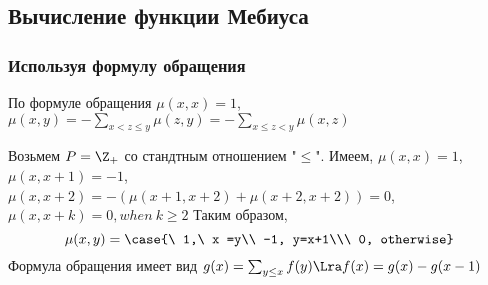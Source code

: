 \documentclass[unicode, 10pt, a4paper, oneside, fleqn]{article}
\begin{document}
\subsection{Вычисление функции Мебиуса}
\subsubsection{Используя формулу обращения}
По формуле обращения $\mu(x,x) =1$, $\displaystyle \mu(x,y) = -\sum_{x<z\le y}\mu(z,y) =-\sum_{x\le z<y}\mu(x,z)$
\begin{ex}
  Возьмем $P=\Z_+$ со стандтным отношением "$\le$". Имеем,
  $\mu(x,x) =1$, $\mu(x,x+1)=-1$, $\mu(x,x+2) = -(\mu(x+1,x+2) + \mu(x+2,x+2)) = 0$,
  $\mu(x,x+k) = 0, when\  k\ge 2$\WHY
  Таким образом, 
  \begin{displaymath}
    \mu(x,y) = \case{\ 1,\  x =y\\ -1, y=x+1\\\ 0, otherwise}
  \end{displaymath}
  Формула обращения имеет вид 
  $g(x) = \sum_{y\le x}f(y) \Lra f(x)=g(x) - g(x-1)$
\end{ex}
\end{document}
